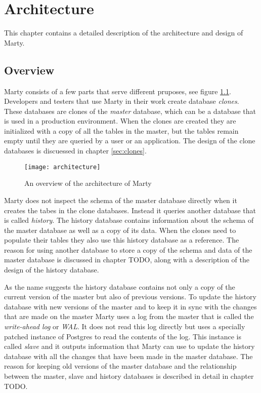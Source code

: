 
\chapter{Architecture}
This chapter contains a detailed description of the architecture and design of Marty.

\section{Overview}
Marty consists of a few parts that serve different pruposes, see figure \ref{architecture-overview}.
Developers and testers that use Marty in their work create database \textit{clones}.
These databases are clones of the \textit{master} database, which can be a database that is used in a production environment.
When the clones are created they are initialized with a copy of all the tables in the master, but the tables remain empty until they are queried by a user or an application.
The design of the clone databases is discuessed in chapter \ref{sec:clones}.

\begin{figure}[h!]
  \centering
    \texttt{[image: architecture]}
  \caption{An overview of the architecture of Marty}
  \label{architecture-overview}
\end{figure}

Marty does not inspect the schema of the master database directly when it creates the tabes in the clone databases.
Instead it queries another database that is called \textit{history}.
The history database contains information about the schema of the master database as well as a copy of its data.
When the clones need to populate their tables they also use this history database as a reference.
The reason for using another database to store a copy of the schema and data of the master database is discussed in chapter TODO, along with a description of the design of the history database.

As the name suggests the history database contains not only a copy of the current version of the master but also of previous versions.
To update the history database with new versions of the master and to keep it in sync with the changes that are made on the master Marty uses a log from the master that is called the \textit{write-ahead log} or \textit{WAL}.
It does not read this log directly but uses a specially patched instance of Postgres to read the contents of the log.
This instance is called \textit{slave} and it outputs information that Marty can use to update the history database with all the changes that have been made in the master database.
The reason for keeping old versions of the master database and the relationship between the master, slave and history databases is described in detail in chapter TODO.

